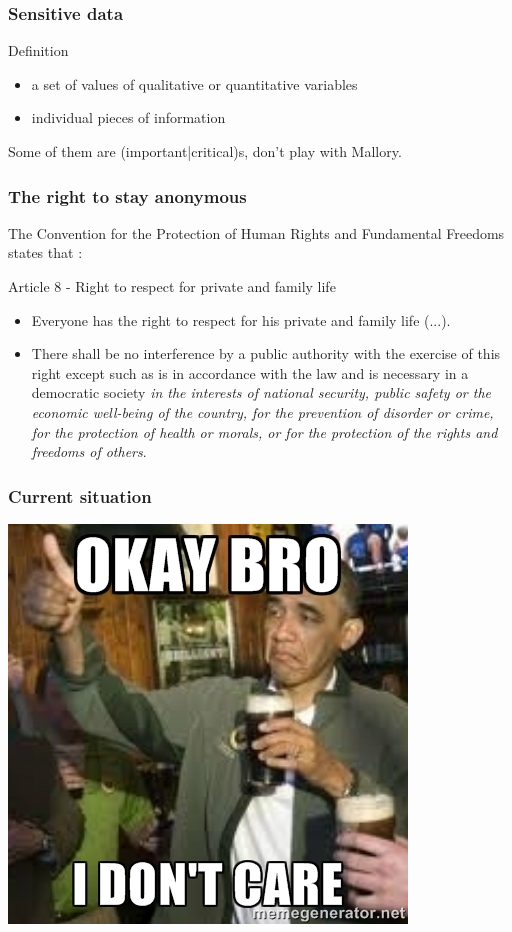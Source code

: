 \begin{frame}
\frametitle{Sensitive data}
\begin{block}{Definition}
\begin{itemize}
\item a set of values of qualitative or quantitative variables
\item individual pieces of information
\end{itemize}
\end{block}
Some of them are (important|critical)s, don't play with Mallory.
\end{frame}
\begin{frame}
\frametitle{The right to stay anonymous}
The Convention for the Protection of Human Rights and Fundamental Freedoms states
that :
\begin{block}{Article 8 - Right to respect for private and family life}
\begin{itemize}
\item Everyone has the right to respect for his private and family life (...).
\item  There shall be no interference by a public authority with the exercise
of this right except such as is in accordance with the law and is necessary in
a democratic society \emph{in the interests of national security, public safety or
the economic well-being of the country, for the prevention of disorder or crime,
for the protection of health or morals, or for the protection of the rights and
freedoms of others}.
\end{itemize}
\end{block}
\end{frame}
\begin{frame}
\frametitle{Current situation}
\begin{center}
\includegraphics[height=.8\textheight]{./materials/meme_obama_dont_care}
\end{center}
\end{frame}
